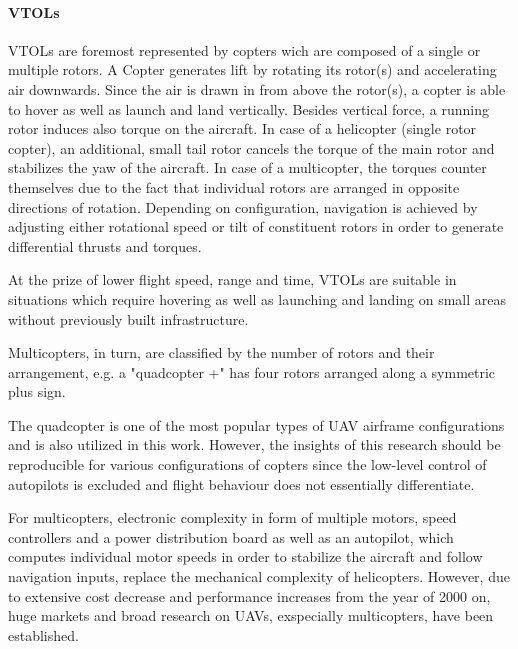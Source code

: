 \paragraph{VTOLs}
VTOLs are foremost represented by
copters wich are composed of a single or multiple rotors.
A Copter generates lift by rotating its rotor(s)
and accelerating air downwards.
Since the air is drawn in from above the rotor(s),
a copter is able to hover as well as launch and land vertically.
Besides vertical force,
a running rotor induces also torque
on the aircraft.
In case of a helicopter (single rotor copter),
an additional, small tail rotor
cancels the torque of the main rotor and 
stabilizes the yaw of the aircraft.
In case of a multicopter,
the torques counter themselves
due to the fact that individual rotors
are arranged in opposite directions of rotation.
Depending on configuration, 
navigation is achieved by
adjusting either rotational speed 
or tilt of constituent rotors
in order to
generate differential thrusts and torques.

At the prize of lower flight speed, range and time,
VTOLs are suitable in situations which
require hovering as well as launching and landing on small areas 
without previously built infrastructure.

Multicopters, in turn, are classified by the number
of rotors and their arrangement, e.g. a "quadcopter +" has four rotors
arranged along a symmetric plus sign.


The quadcopter is one of the most popular types of
UAV airframe configurations and is also utilized
in this work. However, the insights of this
research should be reproducible for various configurations
of copters since the low-level control
of autopilots is excluded and flight behaviour
does not essentially differentiate.


For multicopters,
electronic complexity in form of multiple motors,
speed controllers and a power distribution board
as well as an autopilot,
which computes individual motor speeds in order to
stabilize the aircraft and follow navigation inputs,
replace the mechanical complexity of
helicopters. 
However, due to extensive cost decrease
and performance increases from the year of 2000 on,
huge markets and broad research on UAVs, exspecially multicopters,
have been established.




